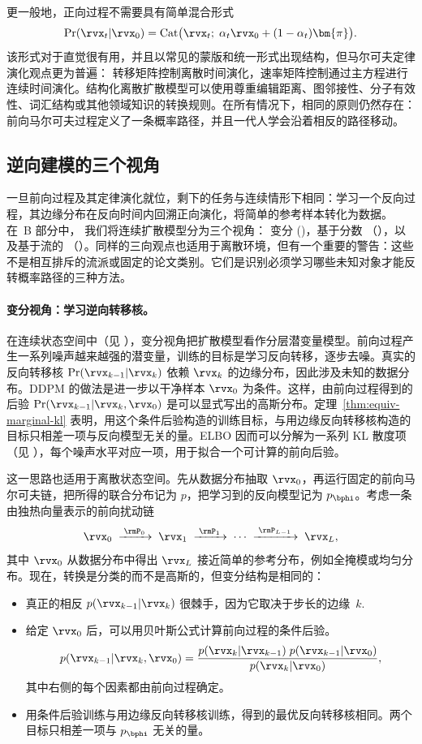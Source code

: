 更一般地，正向过程不需要具有简单混合形式
\[
\Pr(\rvx_t|\rvx_0)
= \mathrm{Cat}\bigl(\rvx_t;\;\alpha_t\rvx_0+(1-\alpha_t)\bm{\pi}\bigr).
\]
该形式对于直觉很有用，并且以常见的蒙版和统一形式出现结构，但马尔可夫定律演化观点更为普遍：
转移矩阵控制离散时间演化，速率矩阵控制通过主方程进行连续时间演化。结构化离散扩散模型可以使用尊重编辑距离、图邻接性、分子有效性、词汇结构或其他领域知识的转换规则。在所有情况下，相同的原则仍然存在：前向马尔可夫过程定义了一条概率路径，并且一代人学会沿着相反的路径移动。

\subsection{逆向建模的三个视角}
\label{subsec:epilogue-three-views}

一旦前向过程及其定律演化就位，剩下的任务与连续情形下相同：学习一个反向过程，其边缘分布在反向时间内回溯正向演化，将简单的参考样本转化为数据。在~B 部分中，
我们将连续扩散模型分为三个视角：
变分 ()，基于分数
（），以及基于流的
（）。同样的三向观点也适用于离散环境，但有一个重要的警告：这些不是相互排斥的流派或固定的论文类别。它们是识别必须学习哪些未知对象才能反转概率路径的三种方法。

\paragraph{变分视角：学习逆向转移核。}
在连续状态空间中（见 ），变分视角把扩散模型看作分层潜变量模型。前向过程产生一系列噪声越来越强的潜变量，训练的目标是学习反向转移，逐步去噪。真实的反向转移核 $\Pr(\rvx_{k-1}|\rvx_k)$ 依赖 $\rvx_k$ 的边缘分布，因此涉及未知的数据分布。DDPM 的做法是进一步以干净样本 $\rvx_0$ 为条件。这样，由前向过程得到的后验 $\Pr(\rvx_{k-1}|\rvx_k, \rvx_0)$ 是可以显式写出的高斯分布。定理~\ref{thm:equiv-marginal-kl} 表明，用这个条件后验构造的训练目标，与用边缘反向转移核构造的目标只相差一项与反向模型无关的量。ELBO 因而可以分解为一系列 KL 散度项（见 ），每个噪声水平对应一项，用于拟合一个可计算的前向后验。

这一思路也适用于离散状态空间。先从数据分布抽取 $\rvx_0$，再运行固定的前向马尔可夫链，把所得的联合分布记为 $p$，把学习到的反向模型记为 $p_{\bphi}$。考虑一条由独热向量表示的前向扰动链
\[
\rvx_0 \;\xrightarrow{\;\rmP_0\;}\; \rvx_1 \;\xrightarrow{\;\rmP_1\;}\;
\cdots \;\xrightarrow{\;\rmP_{L-1}\;}\; \rvx_L,
\]
其中 $\rvx_0$ 从数据分布中得出 $\rvx_L$ 接近简单的参考分布，例如全掩模或均匀分布。现在，转换是分类的而不是高斯的，但变分结构是相同的：
\begin{itemize}[leftmargin=2em]
    \item 真正的相反 $p(\rvx_{k-1}|\rvx_k)$ 很棘手，因为它取决于步长的边缘~$k$.
    \item 给定 $\rvx_0$ 后，可以用贝叶斯公式计算前向过程的条件后验。
      \[
      p(\rvx_{k-1}|\rvx_k, \rvx_0)
      =
      \frac{p(\rvx_k|\rvx_{k-1})\;p(\rvx_{k-1}|\rvx_0)}
             {p(\rvx_k|\rvx_0)},
      \]
      其中右侧的每个因素都由前向过程确定。
    \item 用条件后验训练与用边缘反向转移核训练，得到的最优反向转移核相同。两个目标只相差一项与 $p_{\bphi}$ 无关的量。
\end{itemize}

